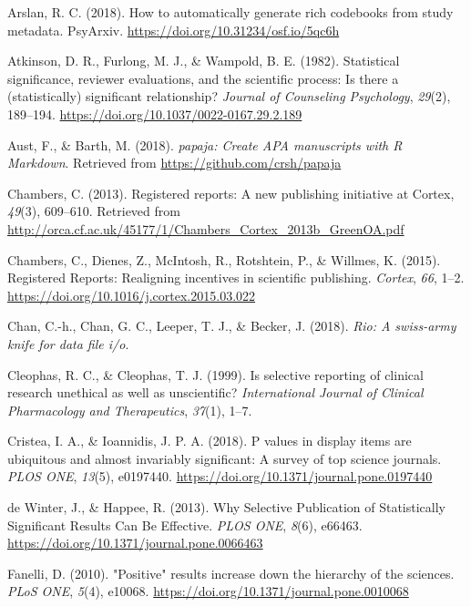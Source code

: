 \documentclass[british,,jou,floatsintext]{apa6}
\begin{document}
\leavevmode\hypertarget{ref-R-codebook}{}%
Arslan, R. C. (2018). How to automatically generate rich codebooks from study metadata. PsyArxiv. \url{https://doi.org/10.31234/osf.io/5qc6h}

\leavevmode\hypertarget{ref-Atkinson1982}{}%
Atkinson, D. R., Furlong, M. J., \& Wampold, B. E. (1982). Statistical significance, reviewer evaluations, and the scientific process: Is there a (statistically) significant relationship? \emph{Journal of Counseling Psychology}, \emph{29}(2), 189--194. \url{https://doi.org/10.1037/0022-0167.29.2.189}

\leavevmode\hypertarget{ref-R-papaja}{}%
Aust, F., \& Barth, M. (2018). \emph{papaja: Create APA manuscripts with R Markdown}. Retrieved from \url{https://github.com/crsh/papaja}

\leavevmode\hypertarget{ref-Chambers2013}{}%
Chambers, C. (2013). Registered reports: A new publishing initiative at Cortex, \emph{49}(3), 609--610. Retrieved from \url{http://orca.cf.ac.uk/45177/1/Chambers_Cortex_2013b_GreenOA.pdf}

\leavevmode\hypertarget{ref-Chambers2015}{}%
Chambers, C., Dienes, Z., McIntosh, R., Rotshtein, P., \& Willmes, K. (2015). Registered Reports: Realigning incentives in scientific publishing. \emph{Cortex}, \emph{66}, 1--2. \url{https://doi.org/10.1016/j.cortex.2015.03.022}

\leavevmode\hypertarget{ref-R-rio}{}%
Chan, C.-h., Chan, G. C., Leeper, T. J., \& Becker, J. (2018). \emph{Rio: A swiss-army knife for data file i/o}.

\leavevmode\hypertarget{ref-Cleophas1999}{}%
Cleophas, R. C., \& Cleophas, T. J. (1999). Is selective reporting of clinical research unethical as well as unscientific? \emph{International Journal of Clinical Pharmacology and Therapeutics}, \emph{37}(1), 1--7.

\leavevmode\hypertarget{ref-Cristea2018}{}%
Cristea, I. A., \& Ioannidis, J. P. A. (2018). P values in display items are ubiquitous and almost invariably significant: A survey of top science journals. \emph{PLOS ONE}, \emph{13}(5), e0197440. \url{https://doi.org/10.1371/journal.pone.0197440}

\leavevmode\hypertarget{ref-deWinter2013}{}%
de Winter, J., \& Happee, R. (2013). Why Selective Publication of Statistically Significant Results Can Be Effective. \emph{PLOS ONE}, \emph{8}(6), e66463. \url{https://doi.org/10.1371/journal.pone.0066463}

\leavevmode\hypertarget{ref-Fanelli2010}{}%
Fanelli, D. (2010). "Positive" results increase down the hierarchy of the sciences. \emph{PLoS ONE}, \emph{5}(4), e10068. \url{https://doi.org/10.1371/journal.pone.0010068}
\end{document}
